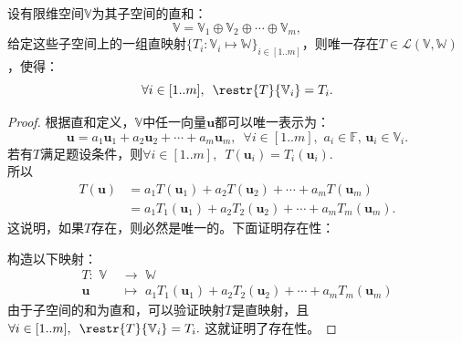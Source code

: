 \documentclass[12pt,UTF8,fontset=none]{ctexbook}
\begin{document}
\begin{pp}\label{pp:3_1}
    设有限维空间$\mathbb{V}$为其子空间的直和：
    $$ \mathbb{V} = \mathbb{V}_1 \oplus \mathbb{V}_2 \oplus \cdots \oplus \mathbb{V}_m, $$
    给定这些子空间上的一组直映射$\{T_i:\mathbb{V}_i\mapsto\mathbb{W}\}_{i\in\left[1..m\right]}$，则唯一存在$T\in\mathcal{L}(\mathbb{V},\mathbb{W})$，使得：
    $$ \forall i\in[1..m],\,\,\, \restr{T}{\mathbb{V}_i} = T_i.$$

\end{pp}
\begin{proof} %
    根据直和定义，$\mathbb{V}$中任一向量$\mathbf{u}$都可以唯一表示为：
    $$ \mathbf{u} = a_1\mathbf{u}_1 + a_2\mathbf{u}_2 + \cdots + a_m\mathbf{u}_m,\,\,\, \forall i\in[1..m],\,\,a_i\in\mathbb{F},\,\mathbf{u}_i\in\mathbb{V}_i.$$
    若有$T$满足题设条件，则$\forall i \in[1..m],\,\,\,T(\mathbf{u}_i) = T_i(\mathbf{u}_i)$.\\
    所以
    \begin{align*}
        T(\mathbf{u}) &= a_1T(\mathbf{u}_1) + a_2T(\mathbf{u}_2) + \cdots + a_mT(\mathbf{u}_m)  \\
                      &= a_1T_1(\mathbf{u}_1) + a_2T_2(\mathbf{u}_2) + \cdots + a_mT_m(\mathbf{u}_m). 
    \end{align*}
    这说明，如果$T$存在，则必然是唯一的。下面证明存在性：

    构造以下映射：
    \begin{align*}
        T: \,\, \mathbb{V} \,\,& \to \,\,\mathbb{W}  \\
        \mathbf{u} \,\,& \mapsto \,\, a_1T_1(\mathbf{u}_1) + a_2T_2(\mathbf{u}_2) + \cdots + a_mT_m(\mathbf{u}_m) 
    \end{align*} 
    由于子空间的和为直和，可以验证映射$T$是直映射，且$\forall i\in[1..m],\,\,\, \restr{T}{\mathbb{V}_i} = T_i.$ 
    这就证明了存在性。

\end{proof}
\end{document}
